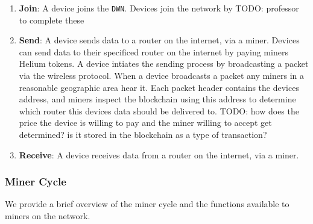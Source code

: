 \documentclass[letterpaper,11pt]{article}
\newcommand{\todo}[1]{}
\renewcommand{\todo}[1]{{\color{red} TODO: {#1}}}
\begin{document}
\begin{enumerate}
  \item \textbf{Join}: A device joins the \verb|DWN|.\newline
  Devices join the network by \todo{professor to complete these}\newline

  \item \textbf{Send}: A device sends data to a router on the internet, via a miner.\newline
  Devices can send data to their specificed router on the internet by paying miners Helium tokens.\newline\newline
  A device intiates the sending process by broadcasting a packet via the wireless protocol. When a device broadcasts a packet any miners in a reasonable geographic area hear it. Each packet header contains the devices address, and miners inspect the blockchain using this address to determine which router this devices data should be delivered to. \todo{how does the price the device is willing to pay and the miner willing to accept get determined? is it stored in the blockchain as a type of transaction?}\newline

  \item \textbf{Receive}: A device receives data from a router on the internet, via a miner.\newline


\end{enumerate}

\subsubsection{Miner Cycle}\label{mining}

We provide a brief overview of the miner cycle and the functions available to miners on the network.
\end{document}

